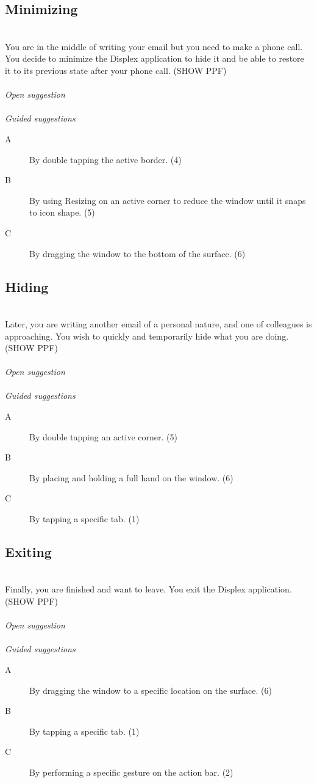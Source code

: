 \subsection{Minimizing}
\hfill\\
You are in the middle of writing your email but you need to make a phone call. You decide to minimize the Displex application to hide it and be able to restore it to its previous state after your phone call.
(SHOW PPF)
\\\\
\emph{Open suggestion}
\\\\
\emph{Guided suggestions}
\begin{description}
\item[A]{By double tapping the active border. (4)}
\item[B]{By using Resizing on an active corner to reduce the window until it snaps to icon shape. (5)}
\item[C]{By dragging the window to the bottom of the surface. (6)}
\end{description}


\subsection{Hiding}
\hfill\\
Later, you are writing another email of a personal nature, and one of colleagues is approaching. You wish to quickly and temporarily hide what you are doing.
(SHOW PPF)
\\\\
\emph{Open suggestion}
\\\\
\emph{Guided suggestions}
\begin{description}
\item[A]{By double tapping an active corner. (5)}
\item[B]{By placing and holding a full hand on the window. (6)}
\item[C]{By tapping a specific tab. (1)}
\end{description}


\subsection{Exiting}
\hfill\\
Finally, you are finished and want to leave. You exit the Displex application.
(SHOW PPF)
\\\\
\emph{Open suggestion}
\\\\
\emph{Guided suggestions}
\begin{description}
\item[A]{By dragging the window to a specific location on the surface. (6)}
\item[B]{By tapping a specific tab. (1)}
\item[C]{By performing a specific gesture on the action bar. (2)}
\end{description}

  
